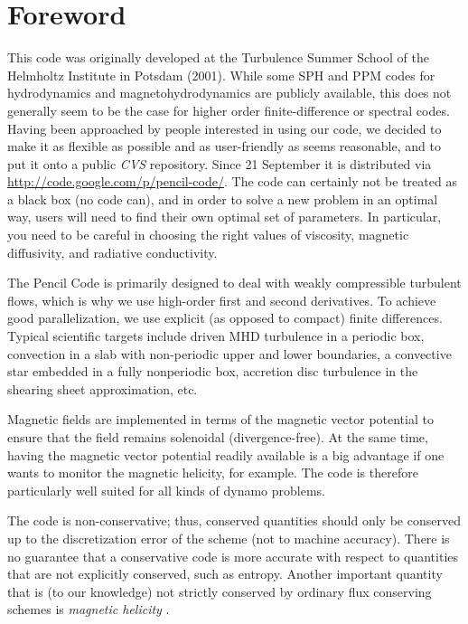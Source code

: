 \documentclass[\mydriver,12pt,twoside,notitlepage,a4paper]{article}
\makeatletter
\newcommand{\name}[2][]{%
  \def\index@{#1}%
  \textsl{#2\/}%
  \ifx\index@\@empty\index{#2@\MakeUppercase #2}%
  \else\index{#1}%
  \fi%
}
\makeatother
\begin{document}

\section*{Foreword}

This code was originally developed at the Turbulence Summer School of the
Helmholtz Institute in Potsdam (2001).
While some SPH and PPM codes for hydrodynamics and magnetohydrodynamics
are publicly available, this does not generally seem to be
the case for higher order finite-difference or spectral codes.
Having been approached by people interested in using our code, we
decided to make it as flexible as possible and as user-friendly as seems
reasonable, and to put it onto a public \name{CVS} repository.
Since 21 September it is distributed via
\url{http://code.google.com/p/pencil-code/}.
The code can certainly not be treated as a black box (no code can), and in
order to solve a new problem in an optimal way, users will need to find their
own optimal set of parameters.
In particular, you need to be careful in choosing
the right values of viscosity, magnetic diffusivity, and radiative
conductivity.

The {\sc Pencil Code} is primarily designed to deal with weakly compressible
turbulent flows, which is why we use high-order first and second derivatives.
To achieve good parallelization, we use explicit
(as opposed to compact) finite differences.
Typical scientific targets include driven MHD turbulence in a periodic box,
convection in a slab with non-periodic upper and lower boundaries,
a convective star embedded in a fully nonperiodic box, accretion disc
turbulence in the shearing sheet approximation, etc.

Magnetic fields are implemented in terms of the magnetic vector potential
to ensure that the field remains solenoidal (divergence-free).
At the same time, having the magnetic
vector potential readily available is a big advantage if
one wants to monitor the magnetic helicity, for example.
The code is therefore particularly well suited for all kinds of
dynamo problems.

The code is non-conservative; thus, conserved quantities should only be
conserved up to the discretization error of the scheme (not to machine
accuracy).
There is no guarantee that a conservative code is more accurate with
respect to quantities that are not explicitly conserved, such as entropy.
Another important quantity that is (to our knowledge) not strictly
conserved by ordinary flux conserving schemes is \name{magnetic helicity}.
\end{document}
